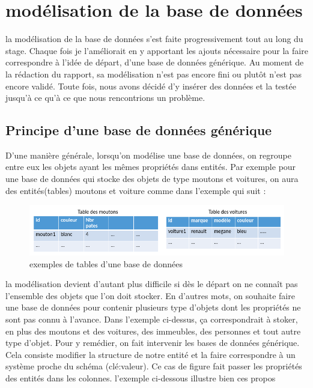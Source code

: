 \section{modélisation de la base de données}
la modélisation de la base de données s'est faite progressivement tout au long du stage. Chaque fois je l'améliorait en y apportant les ajouts nécessaire pour la faire correspondre à l'idée de départ, d'une base de données générique. Au moment de la rédaction du rapport, sa modélisation n'est pas encore fini ou plutôt n'est pas encore validé. Toute fois, nous avons décidé d'y insérer des données et la testée jusqu'à ce qu'à ce que nous rencontrions un problème.
\subsection{Principe d'une base de données générique}
D'une manière générale, lorsqu'on modélise une base de données, on regroupe entre eux les objets ayant les mêmes propriétés dans entités. Par exemple pour une base de données qui stocke des objets de type moutons et voitures, on aura des entités(tables) moutons et voiture comme dans l'exemple qui suit : 

\begin{figure}[h!]
\begin{center}
\includegraphics[width=1\textwidth]{images/bd_image1.png}
\end{center}
\caption{exemples de tables d'une base de données}
\label{exemples de tables d'une base de données}
\end{figure}

la modélisation devient d'autant plus difficile si dès le départ on ne connaît pas l'ensemble des objets que l'on doit stocker. En d'autres mots, on souhaite faire une base de données pour contenir plusieurs type d'objets dont les propriétés ne sont pas connu à l'avance. Dans l'exemple ci-dessus, ça correspondrait à stoker, en plus des moutons et des voitures, des immeubles, des personnes et tout autre type d'objet. Pour y remédier, on fait intervenir les bases de données générique. Cela consiste modifier la structure de notre entité et la faire correspondre à un système proche du schéma (clé:valeur). Ce cas de figure fait passer les propriétés des entités dans les colonnes.
l'exemple ci-dessous illustre bien ces propos

